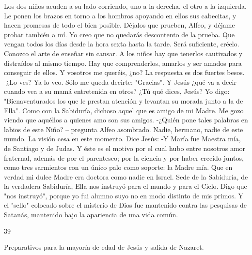 \documentclass[12pt]{book} %
\begin{document}
Los dos niños acuden a su lado corriendo, uno a la derecha, el otro a la izquierda. Le ponen los brazos en torno a los 
hombros apoyando en ellos sus cabecitas, y hacen promesas de todo el bien posible. 
Déjalos que prueben, Alfeo, y déjame probar también a mí. Yo creo que no quedarás descontento de la prueba. Que 
vengan todos los días desde la hora sexta hasta la tarde. Será suficiente, créelo. Conozco el arte de enseñar sin cansar. A los niños hay que tenerlos cautivados y distraídos al mismo tiempo. Hay que comprenderlos, amarlos y ser amados para conseguir de ellos. Y vosotros me queréis, ¿no? 
La respuesta es dos fuertes besos. 
-¿Lo ves? 
Ya lo veo. Sólo me queda decirte: "Gracias". Y Jesús ¿qué va a decir cuando vea a su mamá entretenida en otros? ¿Tú 
qué dices, Jesús? 
Yo digo: "Bienaventurados los que le prestan atención y levantan su morada junto a la de Ella". Como con la Sabiduría, dichoso aquel que es amigo de mi Madre. Me gozo viendo que aquéllos a quienes amo son sus amigos. -¿Quién pone tales palabras en labios de este Niño? – pregunta Alfeo asombrado. 
Nadie, hermano, nadie de este mundo. 
 La visión cesa en este momento. 
Dice Jesús: 
-Y María fue Maestra mía, de Santiago y de Judas. Y éste es el motivo por el cual hubo entre nosotros amor fraternal, 
además de por el parentesco; por la ciencia y por haber crecido juntos, como tres sarmientos con un único palo como soporte: la Madre mía. Que en verdad mi dulce Madre era doctora como nadie en Israel. Sede de la Sabiduría, de la verdadera Sabiduría, Ella nos instruyó para el mundo y para el Cielo. Digo que "nos instruyó", porque yo fui alumno suyo no en modo distinto de mis primos. Y el "sello" colocado sobre el misterio de Dios fue mantenido contra las pesquisas de Satanás, mantenido bajo la apariencia de una vida común. 
 
 
39 
 
Preparativos para la mayoría de edad de Jesús y salida de Nazaret. 
 
\end{document}
